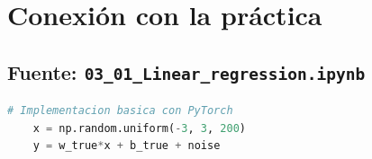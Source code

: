 \section{Conexión con la práctica}
\subsection{Fuente: \texttt{03\_01\_Linear\_regression.ipynb}}
\begin{lstlisting}[language=Python]
	# Implementacion basica con PyTorch
	x = np.random.uniform(-3, 3, 200)
	y = w_true*x + b_true + noise
\end{lstlisting}